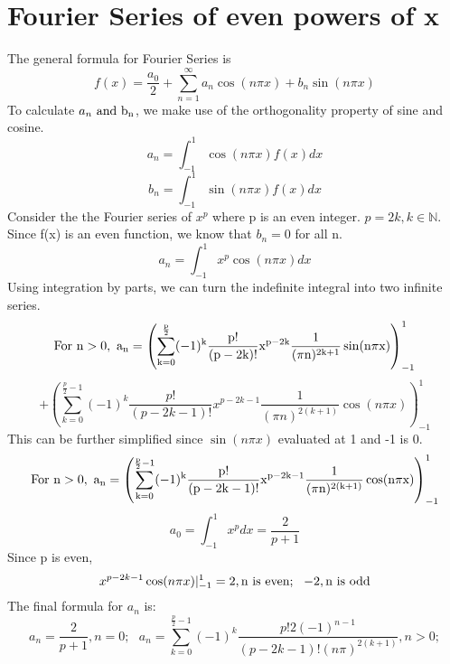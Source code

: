 \documentclass[12pt]{article}
\begin{document}
\section[20pt]{Fourier Series of even powers of x}
The general formula for Fourier Series is
\[f(x)=\frac{a_0}{2}+\sum_{n=1}^{\infty}a_n\cos(n\pi x)+b_n\sin(n\pi x)\]
To calculate \(a_n\ \rm{and}\ b_n\), we make use of the orthogonality property of sine and cosine.
\[a_n=\int_{-1}^{1}\cos(n\pi x)f(x)dx\]
\[b_n=\int_{-1}^{1}\sin(n\pi x)f(x)dx\]
Consider the the Fourier series of \(x^p\) where p is an even integer. \(p=2k, k\in \mathbb{N}\).
Since f(x) is an even function, we know that \(b_n=0\) for all n.
\[a_n=\int_{-1}^{1}x^p\cos(n\pi x)dx\]
Using integration by parts, we can turn the indefinite integral into two infinite series.
\[\rm{For}\ n>0,\ a_n=\left( \sum_{k=0}^{\frac{p}{2}}(-1)^k\frac{p!}{(p-2k)!}x^{p-2k}\frac{1}{(\pi n)^{2k+1}}\sin(n\pi x)\right)_{-1}^1\]
\[+\left( \sum_{k=0}^{\frac{p}{2}-1}(-1)^k\frac{p!}{(p-2k-1)!}x^{p-2k-1}\frac{1}{(\pi n)^{2(k+1)}}\cos(n\pi x)\right)_{-1}^1\]
This can be further simplified since \(\sin(n\pi x)\) evaluated at 1 and -1 is 0.
\[\rm{For}\ n>0,\ a_n=\left(\sum_{k=0}^{\frac{p}{2}-1}(-1)^k\frac{p!}{(p-2k-1)!}x^{p-2k-1}\frac{1}{(\pi n)^{2(k+1)}}\cos(n\pi x)\right)_{-1}^1\]
\[a_0=\int_{-1}^1x^pdx = \frac{2}{p+1}\]
Since p is even,
\[x^{p-2k-1}\cos(n\pi x)|_{-1}^1=2, \textup{n is even};\ \ -2, \textup{n is odd}\]
The final formula for \(a_n\) is:
\[a_n=\frac{2}{p+1}, n=0;\ \ \  a_n=\sum_{k=0}^{\frac{p}{2}-1}(-1)^k\frac{p!2(-1)^{n-1}}{(p-2k-1)!(n\pi)^{2(k+1)}}, n>0;\] \newline \newpage
\end{document}

